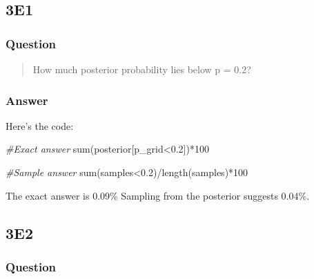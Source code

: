 \documentclass[
]{book}
\newenvironment{Shaded}{\begin{snugshade}}{\end{snugshade}}
\newcommand{\CommentTok}[1]{\textcolor[rgb]{0.56,0.35,0.01}{\textit{#1}}}
\newcommand{\DecValTok}[1]{\textcolor[rgb]{0.00,0.00,0.81}{#1}}
\newcommand{\FloatTok}[1]{\textcolor[rgb]{0.00,0.00,0.81}{#1}}
\newcommand{\FunctionTok}[1]{\textcolor[rgb]{0.00,0.00,0.00}{#1}}
\newcommand{\NormalTok}[1]{#1}
\newcommand{\SpecialCharTok}[1]{\textcolor[rgb]{0.00,0.00,0.00}{#1}}
\begin{document}
\hypertarget{e1-1}{%
\subsection*{3E1}\label{e1-1}}

\hypertarget{question-15}{%
\subsubsection*{Question}\label{question-15}}

\begin{quote}
How much posterior probability lies below p = 0.2?
\end{quote}

\hypertarget{answer-15}{%
\subsubsection*{Answer}\label{answer-15}}

Here's the code:

\begin{Shaded}
\begin{Highlighting}[]
\CommentTok{\#Exact answer}
\FunctionTok{sum}\NormalTok{(posterior[p\_grid}\SpecialCharTok{\textless{}}\FloatTok{0.2}\NormalTok{])}\SpecialCharTok{*}\DecValTok{100}

\CommentTok{\#Sample answer}
\FunctionTok{sum}\NormalTok{(samples}\SpecialCharTok{\textless{}}\FloatTok{0.2}\NormalTok{)}\SpecialCharTok{/}\FunctionTok{length}\NormalTok{(samples)}\SpecialCharTok{*}\DecValTok{100}
\end{Highlighting}
\end{Shaded}

The exact answer is 0.09\% Sampling from the posterior suggests 0.04\%.

\hypertarget{e2-1}{%
\subsection*{3E2}\label{e2-1}}

\hypertarget{question-16}{%
\subsubsection*{Question}\label{question-16}}
\end{document}
